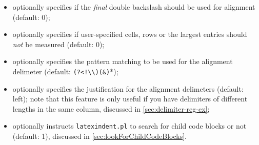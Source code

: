 \begin{itemize}
{        alignment}\texttt{justification}: optionally specifies the justification of each
        cell as either \emph{left} or \emph{right} (default: left);
  \item {}
        optionally specifies if the \emph{final} double backslash should be used for
        alignment (default: 0);
  \item {} optionally specifies if
        user-specified cells, rows or the largest entries should \emph{not} be measured
        (default: 0);
  \item {} optionally
        specifies the pattern matching to be used for the alignment delimeter (default:
        \lstinline* '(?<!\\)(&)'*);
  \item {} optionally
        specifies the justification for the alignment delimeters (default: left); note
        that this feature is only useful if you have delimiters of different lengths in
        the same column, discussed in \cref{sec:delimiter-reg-ex};
  \item {}
        optionally instructs \texttt{latexindent.pl} to search for child code blocks or
        not (default: 1), discussed in \cref{sec:lookForChildCodeBlocks}.
 \end{itemize}

